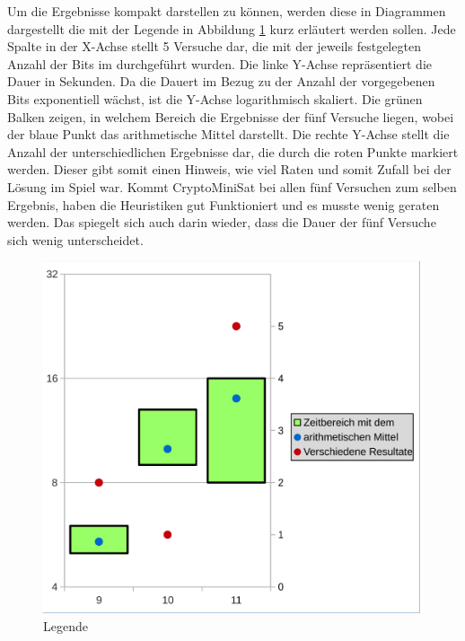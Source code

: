 Um die Ergebnisse kompakt darstellen zu können, werden diese in Diagrammen dargestellt die mit der Legende in Abbildung \ref{fig:data_lengede}
kurz erläutert werden sollen. Jede Spalte in der X-Achse stellt 5 Versuche dar, die mit der jeweils festgelegten Anzahl der Bits im 
durchgeführt wurden. Die linke Y-Achse repräsentiert die Dauer in Sekunden. Da die Dauert im Bezug zu der Anzahl der vorgegebenen Bits exponentiell
wächst, ist die Y-Achse logarithmisch skaliert. Die grünen Balken zeigen, in welchem Bereich die Ergebnisse der fünf Versuche liegen, wobei
der blaue Punkt das arithmetische Mittel darstellt. Die rechte Y-Achse stellt die Anzahl der unterschiedlichen Ergebnisse dar, die durch die
roten Punkte markiert werden. Dieser gibt somit einen Hinweis, wie viel Raten und somit Zufall bei der Lösung im Spiel war. Kommt CryptoMiniSat
bei allen fünf Versuchen zum selben Ergebnis, haben die Heuristiken gut Funktioniert und es musste wenig geraten werden. Das spiegelt sich auch
darin wieder, dass die Dauer der fünf Versuche sich wenig unterscheidet.
\begin{figure}[!h]
  \centering
  \includegraphics[scale=0.55]{images/data_legend}
  \caption{Legende}
  \label{fig:data_lengede}
\end{figure}

